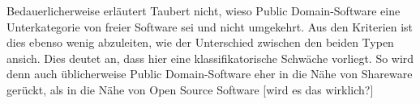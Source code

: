 \documentclass[DIV=calc,BCOR=5mm,11pt,headings=small,oneside,abstract=true, toc=bib]{scrartcl}
\begin{document}
Bedauerlicherweise erläutert Taubert nicht, wieso Public Domain-Software eine
Unterkategorie von freier Software sei und nicht umgekehrt. Aus den Kriterien
ist dies ebenso wenig abzuleiten, wie der Unterschied zwischen den beiden
Typen ansich. Dies deutet an, dass hier eine klassifikatorische Schwäche
vorliegt. So wird denn auch üblicherweise Public Domain-Software eher in die
Nähe von Shareware gerückt, als in die Nähe von Open Source Software [wird es
das wirklich?]

\small

\end{document}
